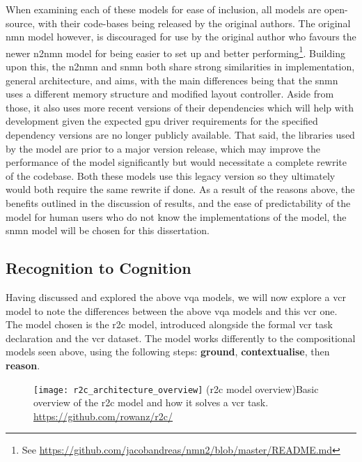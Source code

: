 When examining each of these models for ease of inclusion, all models are open-source, with their code-bases being released by the original authors.
The original \gls{nmn} model however, is discouraged for use by the original author who favours the newer \gls{n2nmn} model for being easier to set up and better performing\footnote{See \url{https://github.com/jacobandreas/nmn2/blob/master/README.md}}.
Building upon this, the \gls{n2nmn} and \gls{snmn} both share strong similarities in implementation, general architecture, and aims, with the main differences being that the \gls{snmn} uses a different memory structure and modified layout controller.
Aside from those, it also uses more recent versions of their dependencies which will help with development given the expected \acrshort{gpu} driver requirements for the specified dependency versions are no longer publicly available.
That said, the libraries used by the model are prior to a major version release, which may improve the performance of the model significantly but would necessitate a complete rewrite of the codebase.
Both these models use this legacy version so they ultimately would both require the same rewrite if done.
As a result of the reasons above, the benefits outlined in the discussion of results, 
and the ease of predictability of the model for human users who do not know the implementations of the model, the \gls{snmn} model will be chosen for this dissertation.

\clearpage
\subsection{Recognition to Cognition}
\label{subsec:recognition_to_cognition}

Having discussed and explored the above \gls{vqa} models, we will now explore a \gls{vcr} model to note the differences between the above \gls{vqa} models and this \gls{vcr} one.
The model chosen is the \gls{r2c} model\cite{zellers_recognition_2019}, introduced alongside the formal \gls{vcr} task declaration and the \gls{vcr} dataset\cite{zellers_recognition_2019}.
The model works differently to the compositional models seen above, using the following steps: \textbf{ground}, \textbf{contextualise}, then \textbf{reason}.

\begin{figure}[htbp]
    \centering
    \texttt{[image: r2c\_architecture\_overview]}
    \captionsource(\acrshort{r2c} model overview){Basic overview of the \acrshort{r2c} model and how it solves a \acrshort{vcr} task. \label{fig:r2c_architecture_overview}}{\url{https://github.com/rowanz/r2c/}}
\end{figure}


